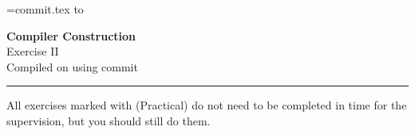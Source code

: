 \documentclass[10pt,a4paper]{exam} %
\begin{document}
\newcommand{\course}{Compiler Construction}
\newcommand{\week}{II}
\newcommand{\topics}{}

\everymath{\color{campurpledark}}
\everydisplay{\color{campurpledark}}




\marksnotpoints
\pointsdroppedatright
\marksnotpoints
\marginpointname{ \points}

\immediate{}
\immediate{}
\newread\myread
\openin\myread=commit.tex
\readline\myread to \commit

\newcommand{\commitlink}[1]{\href{https://github.com/mbg/compilers-exercises/commit/#1}{#1}}

\begin{center}
\LARGE {\textbf{\color{campurpledark} \course} }\\[-0.2cm]
\Large \color{campurpledark} Exercise \week\\
{
	\footnotesize Compiled on  using commit 
}
\end{center}

{\color{campurple}\hrule}

\newcommand{\terminal}[1]{\texttt{\color{campurple}#1}}
\newcommand{\bl}[1]{{\color{black}#1}}

\vspace{0.5cm}

All exercises marked with (Practical) do not need to be completed in time for the supervision, but you should still do them.
\end{document}
